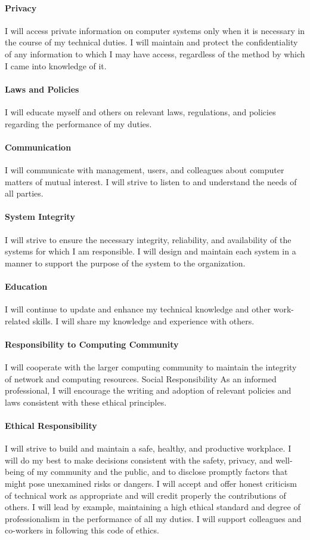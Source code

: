 \documentclass[8pt]{extarticle}
\begin{document}
\begin{multicols}{3}
\paragraph{Privacy} I will access private information on computer systems only when it is necessary in the course of
my technical duties. I will maintain and protect the confidentiality of any information to which I may
have access, regardless of the method by which I came into knowledge of it.
\paragraph{Laws and Policies} I will educate myself and others on relevant laws, regulations,
and policies regarding the performance of my duties.

\paragraph{Communication} I will communicate with management, users, and colleagues about computer matters
of mutual interest. I will strive to listen to and understand the needs of all parties.
\paragraph{System Integrity} I will strive to ensure the necessary integrity, reliability, and availability of the systems
for which I am responsible.
I will design and maintain each system in a manner to support the purpose of the system to the
organization.
\paragraph{Education} I will continue to update and enhance my technical knowledge and other work-related skills.
I will share my knowledge and experience with others.
\paragraph{Responsibility to Computing Community} I will cooperate with the larger computing community to
maintain the integrity of network and computing resources.
Social Responsibility As an informed professional, I will encourage the writing and adoption of relevant
policies and laws consistent with these ethical principles.
\paragraph{Ethical Responsibility} I will strive to build and maintain a safe, healthy, and productive workplace.
I will do my best to make decisions consistent with the safety, privacy, and well-being of my community
and the public, and to disclose promptly factors that might pose unexamined risks or dangers.
I will accept and offer honest criticism of technical work as appropriate and will credit properly the
contributions of others.
I will lead by example, maintaining a high ethical standard and degree of professionalism in the
performance of all my duties. I will support colleagues and co-workers in following this code of ethics.
\end{multicols}
\end{document}
